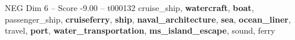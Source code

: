 \begin{textsample}{NEG Dim 6 – Score -9.00 – t000132}  \label{ex:f6_neg_016}
cruise\_ship, \textbf{watercraft}, \textbf{boat}, passenger\_ship, \textbf{cruiseferry}, \textbf{ship}, \textbf{naval\_architecture}, \textbf{sea}, \textbf{ocean\_liner}, travel, \textbf{port}, \textbf{water\_transportation}, \textbf{ms\_island\_escape}, sound, ferry

\end{textsample}
